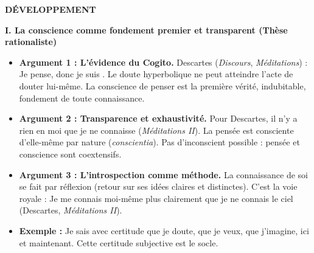\documentclass[11pt]{article}
\newcommand{\cle}[1]{{\popxbold\color{popdark}#1}}
\begin{document}
\begin{corrige}
\textbf{DÉVELOPPEMENT}

\textbf{I. La conscience comme fondement premier et transparent (Thèse rationaliste)}
\begin{itemize}
\item \textbf{Argument 1 : L'évidence du Cogito.} Descartes (\emph{Discours}, \emph{Méditations}) : \guillemotleft Je pense, donc je suis \guillemotright. Le doute hyperbolique ne peut atteindre l'acte de douter lui-même. La conscience de penser est la \cle{première vérité}, indubitable, fondement de toute connaissance.
\item \textbf{Argument 2 : Transparence et exhaustivité.} Pour Descartes, \guillemotleft il n'y a rien en moi que je ne connaisse \guillemotright (\emph{Méditations II}). La pensée est \cle{consciente d'elle-même} par nature (\emph{conscientia}). Pas d'inconscient possible : \guillemotleft pensée \guillemotright et \guillemotleft conscience \guillemotright sont coextensifs.
\item \textbf{Argument 3 : L'introspection comme méthode.} La connaissance de soi se fait par \cle{réflexion} (retour sur ses idées claires et distinctes). C'est la voie royale : \guillemotleft Je me connais moi-même plus clairement que je ne connais le ciel \guillemotright (Descartes, \emph{Méditations II}).
\item \textbf{Exemple :} Je sais avec certitude que je doute, que je veux, que j'imagine, ici et maintenant. Cette certitude subjective est le socle.
\end{itemize}


\end{corrige}
\end{document}
